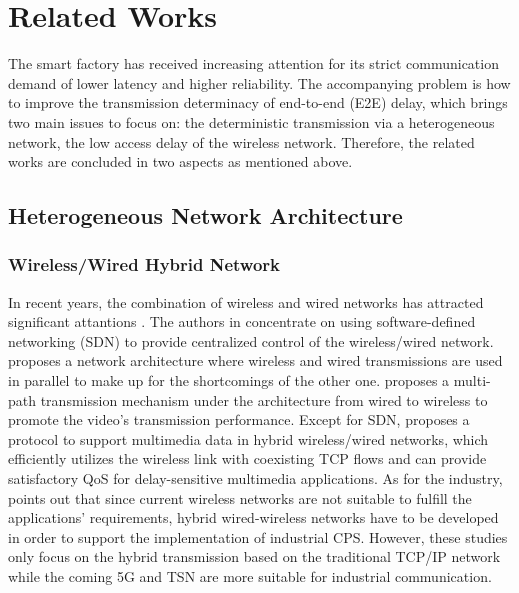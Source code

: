 \documentclass{SCIS2021}
\begin{document}
	\section{Related Works}
	\label{related}
	The smart factory has received increasing attention for its strict communication demand of lower latency and higher reliability. The accompanying problem is how to improve the transmission determinacy of end-to-end (E2E) delay, which brings two main issues to focus on: the deterministic transmission via a heterogeneous network, the low access delay of the wireless network. Therefore, the related works are concluded in two aspects as mentioned above.


	\subsection{Heterogeneous Network Architecture}

	\subsubsection{Wireless/Wired Hybrid Network}
	In recent years, the combination of wireless and wired networks has attracted significant attantions \cite{fu2018software,ke2017improving,cai2006qos,underberg2018towards}. The authors in\cite{fu2018software,ke2017improving} concentrate on using software-defined networking (SDN) to provide centralized control of the wireless/wired network. \cite{fu2018software} proposes a network architecture where wireless and wired transmissions are used in parallel to make up for the shortcomings of the other one. \cite{ke2017improving} proposes a multi-path transmission mechanism under the architecture from wired to wireless to promote the video's transmission performance. Except for SDN, \cite{cai2006qos} proposes a protocol to support multimedia data in hybrid wireless/wired networks, which efficiently utilizes the wireless link with coexisting TCP flows and can provide satisfactory QoS for delay-sensitive multimedia applications. As for the industry, \cite{underberg2018towards} points out that since current wireless networks are not suitable to fulfill the applications' requirements, hybrid wired-wireless networks have to be developed in order to support the implementation of industrial CPS. However, these studies only focus on the hybrid transmission based on the traditional TCP/IP network while the coming 5G and TSN are more suitable for industrial communication.
\end{document}
